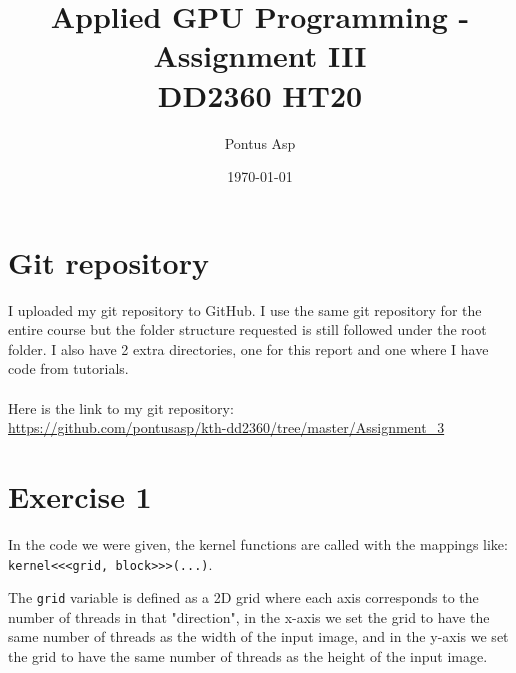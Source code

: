 \documentclass[a4paper, 12pt]{article}
\def\code#1{\texttt{#1}}
\begin{document}
\title{\vspace{4.0cm}Applied GPU Programming - Assignment III\\
\large DD2360 HT20}
\author{Pontus Asp}
\date{\today}
\maketitle
\thispagestyle{empty}
\newpage

\clearpage
{}

\section{Git repository}
I uploaded my git repository to GitHub. I use the same git repository for the entire course but the folder structure requested is still followed under the root folder. I also have 2 extra directories, one for this report and one where I have code from tutorials.
\\\\
Here is the link to my git repository:\\
\url{https://github.com/pontusasp/kth-dd2360/tree/master/Assignment_3}





\section{Exercise 1}
In the code we were given, the kernel functions are called with the mappings like: \code{kernel<<<grid, block>>>(...)}. 

The \code{grid} variable is defined as a 2D grid where each axis corresponds to the number of threads in that "direction", in the x-axis we set the grid to have the same number of threads as the width of the input image, and in the y-axis we set the grid to have the same number of threads as the height of the input image.
\end{document}
